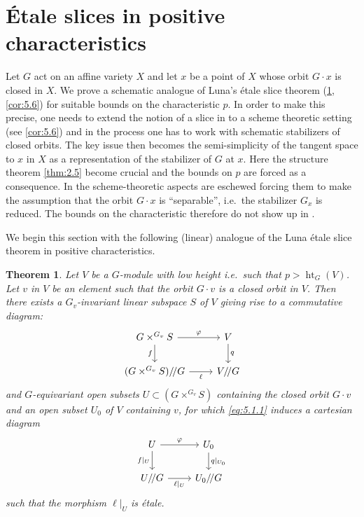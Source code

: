 \documentclass[11pt,a4paper]{article}
\theoremstyle{plain}
\newtheorem{theorem}{Theorem}[section]
\theoremstyle{definition}
\DeclareMathOperator{\htG}{ht}
\begin{document}
\section{\'Etale slices in positive characteristics}
\label{sec:5}

Let $G$ act on an affine variety $X$ and let $x$ be a point of $X$ whose orbit $G \cdot x$ is closed in $X$. We prove a schematic analogue of Luna's \'etale slice theorem (\ref{thm:5.1}, \ref{cor:5.6}) for suitable bounds on the characteristic $p$. In order to make this precise, one needs to extend the notion of a slice in \cite[Definition~7.1]{BR} to a scheme theoretic setting (see \ref{cor:5.6}) and in the process one has to work with schematic stabilizers of closed orbits. The key issue then becomes the semi-simplicity of the tangent space to $x$ in $X$ as a representation of the stabilizer of $G$ at $x$. Here the structure theorem \ref{thm:2.5} become crucial and the bounds on $p$ are forced as a consequence. In \cite{BR} the scheme-theoretic aspects are eschewed forcing them to make the assumption that the orbit $G \cdot x$ is ``separable'', i.e.~the stabilizer $G_x$ is reduced. The bounds on the characteristic therefore do not show up in \cite{BR}.

We begin this section with the following (linear) analogue of the Luna \'etale slice theorem in positive characteristics.

\begin{theorem} \label{thm:5.1}
Let $V$ be a $G$-module with low height i.e.~such that $p > \htG_G(V)$. Let $v$ in $V$ be an element such that the orbit $G \cdot v$ is a closed orbit in $V$. Then there exists a $G_v$-invariant linear subspace $S$ of $V$ giving rise to a commutative diagram:
\begin{equation} \label{eq:5.1.1}
\begin{tikzcd}
G \times^{G_v} S \arrow[r, "\varphi"] \arrow[d, "f"'] & V \arrow[d, "q"] \\
(G \times^{G_v} S) /\!/ G \arrow[r, "\ell"'] & V /\!/ G
\end{tikzcd}
\end{equation}
and $G$-equivariant open subsets $U \subset (G \times^{G_v} S)$ containing the closed orbit $G \cdot v$ and an open subset $U_0$ of $V$ containing $v$, for which \eqref{eq:5.1.1} induces a cartesian diagram
\begin{equation} \label{eq:5.1.2}
\begin{tikzcd}
U \arrow[r, "\varphi"] \arrow[d, "f|_U"'] & U_0 \arrow[d, "q|_{U_0}"] \\
U /\!/ G \arrow[r, "\ell|_U"'] & U_0 /\!/ G
\end{tikzcd}
\end{equation}
such that the morphism $\ell|_U$ is \'etale.
\end{theorem}
\end{document}
